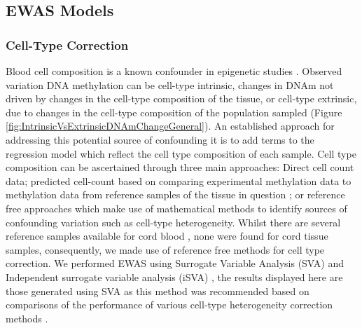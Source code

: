 \documentclass[]{book}
\begin{document}
\hypertarget{ewas-models}{%
\subsection{EWAS Models}\label{ewas-models}}

\hypertarget{cell-type-correction}{%
\subsubsection{Cell-Type Correction}\label{cell-type-correction}}

Blood cell composition is a known confounder in epigenetic studies \citep[\citet{Houseman2012}]{Jaffe2014}. Observed variation DNA methylation can be cell-type intrinsic, changes in DNAm not driven by changes in the cell-type composition of the tissue, or cell-type extrinsic, due to changes in the cell-type composition of the population sampled (Figure \ref{fig:IntrinsicVsExtrinsicDNAmChangeGeneral}). An established approach for addressing this potential source of confounding it is to add terms to the regression model which reflect the cell type composition of each sample. Cell type composition can be ascertained through three main approaches: Direct cell count data; predicted cell-count based on comparing experimental methylation data to methylation data from reference samples of the tissue in question \citep{Houseman2012}; or reference free approaches which make use of mathematical methods to identify sources of confounding variation such as cell-type heterogeneity. Whilst there are several reference samples available for cord blood \citep[\citet{DeGoede2015},\citet{Bakulski2016},\citet{Gervin2016}]{Cardenas2016}, none were found for cord tissue samples, consequently, we made use of reference free methods for cell type correction. We performed EWAS using Surrogate Variable Analysis (SVA) \citep{Leek2007} and Independent surrogate variable analysis (iSVA) \citep{Teschendorff2011}, the results displayed here are those generated using SVA as this method was recommended based on comparisons of the performance of various cell-type heterogeneity correction methods \citep[\citet{Teschendorff2017}]{McGregor2016}.
\end{document}
